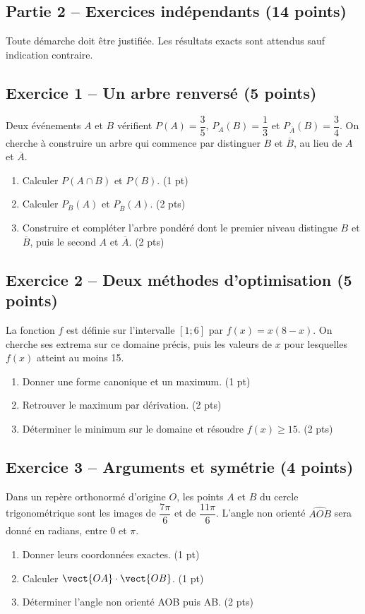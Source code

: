 \clearpage\subsection*{Partie 2 -- Exercices indépendants (14 points)}
Toute démarche doit être justifiée. Les résultats exacts sont attendus sauf indication contraire.
\subsection*{Exercice 1 -- Un arbre renversé (5 points)}
Deux événements $A$ et $B$ vérifient $P(A)=\dfrac35$, $P_A(B)=\dfrac13$ et $P_{\overline A}(B)=\dfrac34$. On cherche à construire un arbre qui commence par distinguer $B$ et $\overline B$, au lieu de $A$ et $\overline A$.
\begin{enumerate}
\item Calculer $P(A\cap B)$ et $P(B)$. \hfill(1 pt)
\item Calculer $P_B(A)$ et $P_{\overline B}(A)$. \hfill(2 pts)
\item Construire et compléter l’arbre pondéré dont le premier niveau distingue $B$ et $\overline B$, puis le second $A$ et $\overline A$. \hfill(2 pts)
\end{enumerate}
\subsection*{Exercice 2 -- Deux méthodes d’optimisation (5 points)}
La fonction $f$ est définie sur l’intervalle $[1;6]$ par $f(x)=x(8-x)$. On cherche ses extrema sur ce domaine précis, puis les valeurs de $x$ pour lesquelles $f(x)$ atteint au moins 15.
\begin{enumerate}
\item Donner une forme canonique et un maximum. \hfill(1 pt)
\item Retrouver le maximum par dérivation. \hfill(2 pts)
\item Déterminer le minimum sur le domaine et résoudre $f(x)\geq15$. \hfill(2 pts)
\end{enumerate}
\subsection*{Exercice 3 -- Arguments et symétrie (4 points)}
Dans un repère orthonormé d’origine $O$, les points $A$ et $B$ du cercle trigonométrique sont les images de $\dfrac{7\pi}6$ et de $\dfrac{11\pi}6$. L’angle non orienté $\widehat{AOB}$ sera donné en radians, entre 0 et $\pi$.
\begin{enumerate}
\item Donner leurs coordonnées exactes. \hfill(1 pt)
\item Calculer $\vect{OA}\cdot\vect{OB}$. \hfill(1 pt)
\item Déterminer l’angle non orienté AOB puis AB. \hfill(2 pts)
\end{enumerate}
